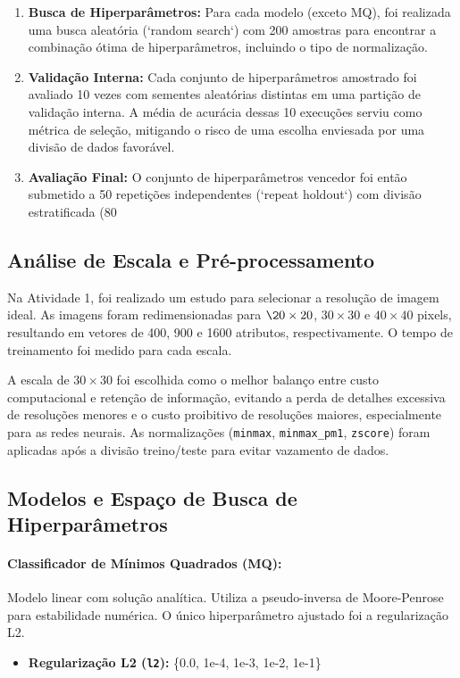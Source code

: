 \documentclass[a4paper,12pt]{article}
\begin{document}
\begin{enumerate}
    \item \textbf{Busca de Hiperparâmetros:} Para cada modelo (exceto MQ), foi realizada uma busca aleatória (`random search`) com 200 amostras para encontrar a combinação ótima de hiperparâmetros, incluindo o tipo de normalização.
    \item \textbf{Validação Interna:} Cada conjunto de hiperparâmetros amostrado foi avaliado 10 vezes com sementes aleatórias distintas em uma partição de validação interna. A média de acurácia dessas 10 execuções serviu como métrica de seleção, mitigando o risco de uma escolha enviesada por uma divisão de dados favorável.
    \item \textbf{Avaliação Final:} O conjunto de hiperparâmetros vencedor foi então submetido a 50 repetições independentes (`repeat holdout`) com divisão estratificada (80%
\end{enumerate}

\subsection{Análise de Escala e Pré-processamento}
Na Atividade 1, foi realizado um estudo para selecionar a resolução de imagem ideal. As imagens foram redimensionadas para \(\20\times 20\), \(30\times 30\) e \(40\times 40\) pixels, resultando em vetores de 400, 900 e 1600 atributos, respectivamente. O tempo de treinamento foi medido para cada escala.

A escala de \(30\times 30\) foi escolhida como o melhor balanço entre custo computacional e retenção de informação, evitando a perda de detalhes excessiva de resoluções menores e o custo proibitivo de resoluções maiores, especialmente para as redes neurais. As normalizações (\texttt{minmax}, \texttt{minmax\_pm1}, \texttt{zscore}) foram aplicadas após a divisão treino/teste para evitar vazamento de dados.

\subsection{Modelos e Espaço de Busca de Hiperparâmetros}

\paragraph{Classificador de Mínimos Quadrados (MQ):}
Modelo linear com solução analítica. Utiliza a pseudo-inversa de Moore-Penrose para estabilidade numérica. O único hiperparâmetro ajustado foi a regularização L2.
\begin{itemize}
    \item \textbf{Regularização L2 (\texttt{l2}):} \{0.0, 1e-4, 1e-3, 1e-2, 1e-1\}
\end{itemize}
\end{document}
